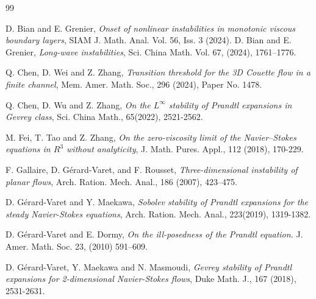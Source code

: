 \documentclass[reqno,11pt]{amsart}
\numberwithin{equation}{section}
\numberwithin{equation}{section}
\theoremstyle{plain}
\begin{document}
\begin{thebibliography}{99}
	
     D. Bian and E. Grenier, {\it Onset of nonlinear instabilities in monotonic viscous 
	boundary layers}, SIAM J. Math. Anal. Vol. 56, Iss. 3 (2024).
     D. Bian and E. Grenier, {\it Long-wave instabilities}, Sci. China Math. Vol. 67, (2024), 1761--1776.

 Q. Chen, D. Wei and Z. Zhang, {\it Transition threshold for the 3D Couette flow in a finite channel}, Mem. Amer. Math. Soc., 296 (2024), Paper No. 1478.

 Q. Chen, D. Wu and Z. Zhang, {\it On the $L^\infty$ stability of Prandtl expansions in Gevrey class}, Sci. China Math., 65(2022), 2521-2562.





 M. Fei, T. Tao and Z. Zhang, {\it On the zero-viscosity limit of the Navier–Stokes equations in $R^3$ without analyticity}, J. Math. Pures. Appl., 112 (2018), 170-229.

 F. Gallaire, D. G\'erard-Varet, and F. Rousset, {\it Three-dimensional instability of planar flows}, Arch. Ration. Mech. Anal., 186 (2007), 423--475.

 D. G\'erard-Varet and Y.  Maekawa,  {\it Sobolev stability of Prandtl expansions for the steady Navier-Stokes equations}, Arch. Ration. Mech. Anal.,  223(2019), 1319-1382.

 D. G\'erard-Varet and E. Dormy, {\it On the ill-posedness of the Prandtl equation. } J. Amer. Math. Soc. 23, (2010) 591--609.

  D. G\'erard-Varet, Y.  Maekawa and N. Masmoudi, {\it Gevrey stability of Prandtl expansions for 2-dimensional Navier-Stokes flows},  Duke Math. J.,  167 (2018),  2531-2631.


\end{thebibliography}
\end{document}
